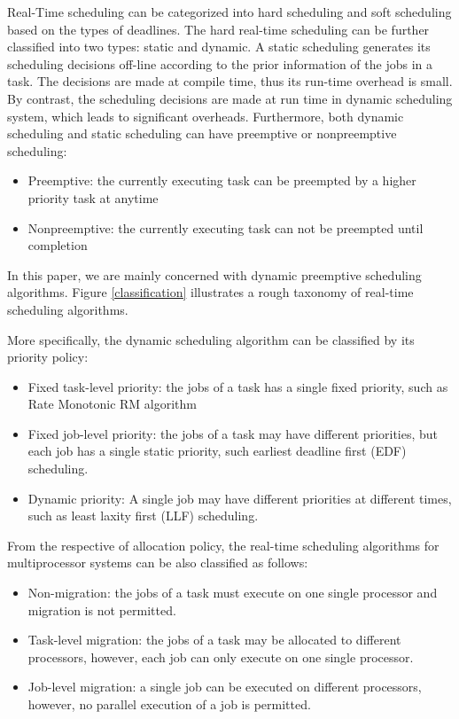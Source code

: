 \documentclass[preprint,12pt]{elsarticle}
\begin{document}
Real-Time scheduling can be categorized into hard scheduling and soft scheduling based on the types of deadlines. The hard real-time scheduling can be further classified into two types: static and dynamic. A static scheduling generates its scheduling decisions off-line according to the prior information of the jobs in a task. The decisions are made at compile time, thus its run-time overhead is small. By contrast, the scheduling decisions are made at run time in dynamic scheduling system, which leads to significant overheads. Furthermore, both dynamic scheduling and static scheduling can have preemptive or nonpreemptive scheduling:

\begin{itemize}
\item Preemptive: the currently executing task can be preempted by a higher priority task at anytime
\item Nonpreemptive: the currently executing task can not be preempted until completion
\end{itemize}

In this paper, we are mainly concerned with dynamic preemptive scheduling algorithms. Figure \ref{classification} illustrates a rough taxonomy of real-time scheduling algorithms.


More specifically, the dynamic scheduling algorithm can be classified by its priority policy\cite{davis2011survey}:

\begin{itemize}
\item Fixed task-level priority: the jobs of a task has a single fixed priority, such as Rate Monotonic RM algorithm

\item Fixed job-level priority: the jobs of a task may have different priorities, but each job has a single static priority, such earliest deadline first (EDF) scheduling.

\item Dynamic priority: A single job may have different priorities at different times, such as least laxity first (LLF) scheduling.
\end{itemize}


From the respective of allocation policy, the real-time scheduling algorithms for multiprocessor systems can be also classified as follows\cite{davis2011survey}:

\begin{itemize}
\item Non-migration: the jobs of a task must execute on one single processor and migration is not permitted.

\item Task-level migration: the jobs of a task may be allocated to different processors, however, each job can only execute on one single processor.

\item Job-level migration: a single job can be executed on different processors, however, no parallel execution of a job is permitted.
\end{itemize}
\end{document}
